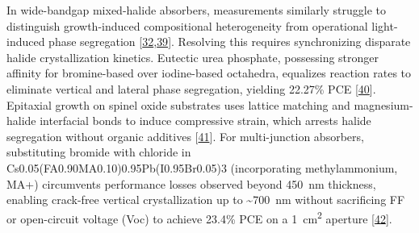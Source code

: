 \documentclass[
  11pt,
]{article}
\begin{document}
In wide-bandgap mixed-halide absorbers, measurements similarly struggle
to distinguish growth-induced compositional heterogeneity from
operational light-induced phase segregation
{[}\href{https://doi.org/10.22541/authorea.15004927/v1}{32},\href{https://doi.org/10.1016/j.xcrp.2026.103346}{39}{]}.
Resolving this requires synchronizing disparate halide crystallization
kinetics. Eutectic urea phosphate, possessing stronger affinity for
bromine-based over iodine-based octahedra, equalizes reaction rates to
eliminate vertical and lateral phase segregation, yielding 22.27\% PCE
{[}\href{https://doi.org/10.1002/anie.2535666}{40}{]}. Epitaxial growth
on spinel oxide substrates uses lattice matching and magnesium-halide
interfacial bonds to induce compressive strain, which arrests halide
segregation without organic additives
{[}\href{https://doi.org/10.1021/jacs.6c04846}{41}{]}. For
multi-junction absorbers, substituting bromide with chloride in
Cs0.05(FA0.90MA0.10)0.95Pb(I0.95Br0.05)3 (incorporating methylammonium,
MA+) circumvents performance losses observed beyond
\qty{450}{\nano\meter} thickness, enabling crack-free vertical
crystallization up to \textasciitilde{}\qty{700}{\nano\meter} without
sacrificing FF or open-circuit voltage (Voc) to achieve 23.4\% PCE on a
\qty{1}{\centi\meter\squared} aperture
{[}\href{https://doi.org/10.1002/solr.70410}{42}{]}.
\end{document}
